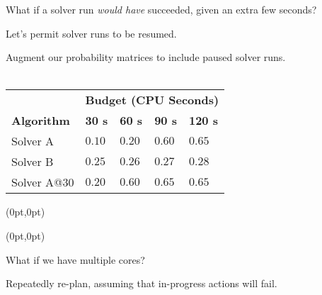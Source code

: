 \begin{frame}
What if a solver run \emph{would have} succeeded, given an extra few seconds?

Let's permit solver runs to be resumed.
\end{frame}

\begin{frame}
Augment our probability matrices to include paused solver runs.
\ \\
\ \\
\begin{center}
\begin{tabular}{lllll}
\toprule
& \multicolumn{4}{l}{{\bf Budget (CPU Seconds)}}\\
\cmidrule{2-5}
{\bf Algorithm} & {\bf 30 s} & {\bf 60 s} & {\bf 90 s} & {\bf 120 s}\\
\midrule
Solver A & $0.10$ & $0.20$ & $0.60$ & $0.65$\\
Solver B & $0.25$ & $0.26$ & $0.27$ & $0.28$\\
Solver A@30 & $0.20$ & $0.60$ & $0.65$ & $0.65$\\
\bottomrule
\end{tabular}
\end{center}
\end{frame}

\begin{frame}
\begin{textblock*}{5in}(0pt,0pt)
%
\end{textblock*}
\end{frame}

\begin{frame}
\begin{textblock*}{5in}(0pt,0pt)
%
\end{textblock*}
\end{frame}

\begin{frame}
What if we have multiple cores?

Repeatedly re-plan, assuming that in-progress actions will fail.
\end{frame}

